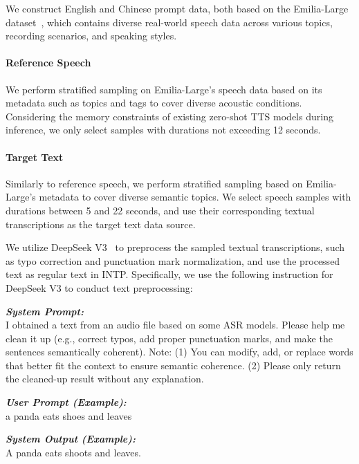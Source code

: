 \documentclass[11pt]{article}
\begin{document}
We construct English and Chinese prompt data, both based on the Emilia-Large dataset~\cite{emilia,emilia-large}, which contains diverse real-world speech data across various topics, recording scenarios, and speaking styles. 

\paragraph{Reference Speech}

We perform stratified sampling on Emilia-Large's speech data based on its metadata such as topics and tags to cover diverse acoustic conditions. Considering the memory constraints of existing zero-shot TTS models during inference, we only select samples with durations not exceeding 12 seconds.

\paragraph{Target Text}\label{sec:appendix-prompt-target-text-construction}
Similarly to reference speech, we perform stratified sampling based on Emilia-Large's metadata to cover diverse semantic topics. We select speech samples with durations between 5 and 22 seconds, and use their corresponding textual transcriptions as the target text data source.

We utilize DeepSeek V3~\cite{deepseek-r1} to preprocess the sampled textual transcriptions, such as typo correction and punctuation mark normalization, and use the processed text as regular text in INTP. Specifically, we use the following instruction for DeepSeek V3 to conduct text preprocessing:

\begin{promptbox}
\textit{\textbf{System Prompt:} }\\
I obtained a text from an audio file based on some ASR models. Please help me clean it up (e.g., correct typos, add proper punctuation marks, and make the sentences semantically coherent). Note: (1) You can modify, add, or replace words that better fit the context to ensure semantic coherence. (2) Please only return the cleaned-up result without any explanation.

\medskip \textit{\textbf{User Prompt (Example):} }\\
a panda eats shoes and leaves

\medskip \textit{\textbf{System Output (Example):} }\\
A panda eats shoots and leaves.
\end{promptbox}
\end{document}
